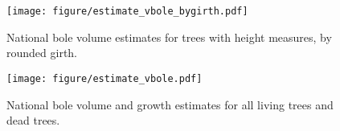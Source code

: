 \begin{figure}
	\texttt{[image: figure/estimate\_vbole\_bygirth.pdf]}
	\caption{National bole volume estimates for trees with height measures, by rounded girth. \label{fig::estimate_vbole_bygirth}}
\end{figure}

\begin{figure}
	\texttt{[image: figure/estimate\_vbole.pdf]}
	\caption{National bole volume and growth estimates for all living trees and dead trees. \label{fig::estimate_vbole}}
\end{figure}


